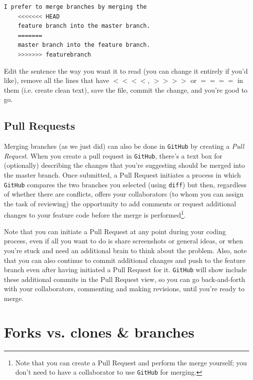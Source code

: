 \documentclass[12pt,letterpaper]{article}
\begin{document}
\begin{lstlisting}[language=bash]
	I prefer to merge branches by merging the
	<<<<<<< HEAD
	feature branch into the master branch.
	=======
	master branch into the feature branch.
	>>>>>>> featurebranch
\end{lstlisting}

\noindent
Edit the sentence the way you want it to read (you can change it entirely if you'd like), remove all the lines that have $<<<<$, $>>>>$ or $====$ in them (i.e. create clean text), save the file, commit the change, and you're good to go.


\subsection{Pull Requests}

Merging branches (as we just did) can also be done in \texttt{GitHub} by creating a \emph{Pull Request}.
When you create a pull request in \texttt{GitHub}, there's a text box for (optionally) describing the changes that you're suggesting should be merged into the master branch.
Once submitted, a Pull Request initiates a process in which \texttt{GitHub} compares the two branches you selected (using \texttt{diff}) but then, regardless of whether there are conflicts, offers your collaborators (to whom you can assign the task of reviewing) the opportunity to add comments or request additional changes to your feature code before the merge is performed\footnote{Note that you can create a Pull Request and perform the merge yourself; you don't need to have a collaborator to use \texttt{GitHub} for merging.}.

Note that you can initiate a Pull Request at any point during your coding process, even if all you want to do is share screenshots or general ideas, or when you're stuck and need an additional brain to think about the problem.
Also, note that you can also continue to commit additional changes and push to the feature branch even after having initiated a Pull Request for it.
\texttt{GitHub} will show include these additional commits in the Pull Request view, so you can go back-and-forth with your collaborators, commenting and making revisions, until you're ready to merge.



\section{Forks vs. clones \& branches}
\end{document}
